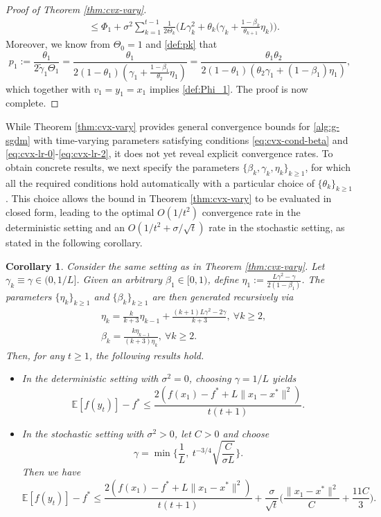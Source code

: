 \documentclass[10pt]{article}
\numberwithin{equation}{section}
\newtheorem{corollary}{Corollary}
\theoremstyle{definition}
\newcommand{\ebb}{\mathbb{E}}  %
\begin{document}
\begin{proof}[Proof of Theorem \ref{thm:cvx-vary}]
\begin{align*}
    &\leq \Phi_1+\sigma^2\sum_{k=1}^{t-1}\frac{1}{2\Theta_k}\Big(L \gamma_k^2+\theta_k\Big(\gamma_k+\frac{1-\beta_k}{\theta_{k+1}}\eta_k\Big)\Big).
\end{align*}
Moreover, we know from $\Theta_0=1$ and \eqref{def:pk} that
\[
p_1:=\frac{\theta_1}{2\tilde{\gamma}_1\Theta_1}=\frac{\theta_1}{2(1-\theta_1)(\gamma_1+\frac{1-\beta_1}{\theta_2}\eta_1)}=\frac{\theta_1\theta_2}{2(1-\theta_1)(\theta_2\gamma_1+(1-\beta_1)\eta_1)},
\]
which together with $v_1=y_1=x_1$ implies \eqref{def:Phi_1}. The proof is now complete.
\end{proof}

While Theorem \ref{thm:cvx-vary} provides general convergence bounds for \eqref{alg:g-sgdm} with time-varying parameters satisfying conditions \eqref{eq:cvx-cond-beta} and \eqref{eq:cvx-lr-0}-\eqref{eq:cvx-lr-2}, it does not yet reveal explicit convergence rates. To obtain concrete results, we next specify the parameters $\{\beta_k, \gamma_k, \eta_k\}_{k\ge 1}$, for which all the required conditions hold automatically with a particular choice of $\{\theta_k\}_{k\ge 1}$. This choice allows the bound in Theorem \ref{thm:cvx-vary} to be evaluated in closed form, leading to the optimal $O(1/t^2)$ convergence rate in the deterministic setting and an $O(1/t^2+\sigma/\sqrt{t})$ rate in the stochastic setting, as stated in the following corollary. 
\begin{corollary}\label{cor:cvx-vary}
    Consider the same setting as in Theorem \ref{thm:cvx-vary}. Let $\gamma_k\equiv\gamma\in (0,1/L]$. Given an arbitrary $\beta_1\in [0,1)$, define $\eta_1:=\frac{L\gamma^2-\gamma}{2(1-\beta_1)}$. The parameters $\{\eta_k\}_{k\ge 1}$ and $\{\beta_k\}_{k\ge 1}$ are then generated recursively via
    \begin{align}
    &\eta_k=\frac{k}{k+3} \eta_{k-1}+\frac{(k+1) L \gamma^2-2 \gamma}{k+3},~\forall k\ge 2,\label{eq:eta-gen}\\
    &\beta_k=\frac{k\eta_{k-1}}{(k+3)\eta_k},~\forall k\ge 2.\label{eq:beta-gen}
    \end{align}
    Then, for any $t\ge 1$, the following results hold.
    \begin{itemize}
        \item[(i).] In the deterministic setting with $\sigma^2=0$, choosing $\gamma=1/L$ yields
        \[
            \ebb[f(y_t)]-f^*\leq \frac{2(f(x_1)-f^*+L\|x_1-x^*\|^2)}{t(t+1)}.
        \]
        \item[(ii).] In the stochastic setting with $\sigma^2>0$, let $C>0$ and choose
        \begin{equation}\label{eq:gamma-gen}
            \gamma=\min\Big\{\frac{1}{L},~t^{-3/4}\sqrt{\frac{C}{\sigma L}}\Big\}.
        \end{equation}
        Then we have
        \[
        \ebb[f(y_t)]-f^*\leq \frac{2(f(x_1)-f^*+L\|x_1-x^*\|^2)}{t(t+1)} + \frac{\sigma}{\sqrt{t}}\Big(\frac{\|x_1-x^*\|^2}{C}+\frac{11C}{3}\Big).
        \]
    \end{itemize}
\end{corollary}
\end{document}
